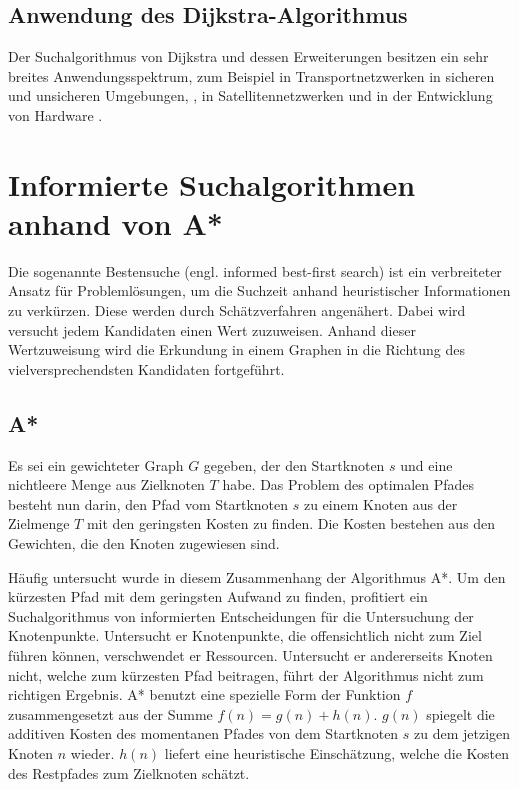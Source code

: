 \subsection{Anwendung des Dijkstra-Algorithmus }

Der Suchalgorithmus von Dijkstra und dessen Erweiterungen besitzen ein sehr breites Anwendungsspektrum, zum Beispiel in Transportnetzwerken in sicheren und unsicheren Umgebungen, \cite{fuzzyDijk} \cite{publicTrans}, in Satellitennetzwerken \cite{satelite} und in der Entwicklung von Hardware \cite{hardware}. 

\section{Informierte Suchalgorithmen anhand von A*}

Die sogenannte Bestensuche (engl. informed best-first search) ist ein verbreiteter Ansatz für Problemlösungen, um die Suchzeit anhand heuristischer Informationen zu verkürzen. Diese werden durch Schätzverfahren angenähert. Dabei wird versucht jedem Kandidaten einen Wert zuzuweisen. Anhand dieser Wertzuweisung wird die Erkundung in einem Graphen in die Richtung des vielversprechendsten Kandidaten fortgeführt.

\subsection{A*} 

Es sei ein gewichteter Graph $G$ gegeben, der den Startknoten $s$ und eine nichtleere Menge aus Zielknoten $T$ habe. Das Problem des optimalen Pfades besteht nun darin, den Pfad vom Startknoten $s$ zu einem Knoten aus der Zielmenge $T$ mit den geringsten Kosten zu finden. Die Kosten bestehen aus den Gewichten, die den Knoten zugewiesen sind\cite{RinaDechterandJudeaPearl.1983}.

Häufig untersucht wurde in diesem Zusammenhang der Algorithmus A*. Um den kürzesten Pfad mit dem geringsten Aufwand zu finden, profitiert ein Suchalgorithmus von informierten Entscheidungen für die Untersuchung der Knotenpunkte. Untersucht er Knotenpunkte, die offensichtlich nicht zum Ziel führen können, verschwendet er Ressourcen. Untersucht er andererseits Knoten nicht, welche zum kürzesten Pfad beitragen, führt der Algorithmus nicht zum richtigen Ergebnis. A* benutzt eine spezielle Form der Funktion $f$ zusammengesetzt aus der Summe $f(n) = g(n) + h(n)$. $g(n)$ spiegelt die additiven Kosten des momentanen Pfades von dem Startknoten $s$ zu dem jetzigen Knoten $n$ wieder. $h(n)$ liefert eine heuristische Einschätzung, welche die Kosten des Restpfades zum Zielknoten schätzt\cite{RinaDechterandJudeaPearl.1983}.

